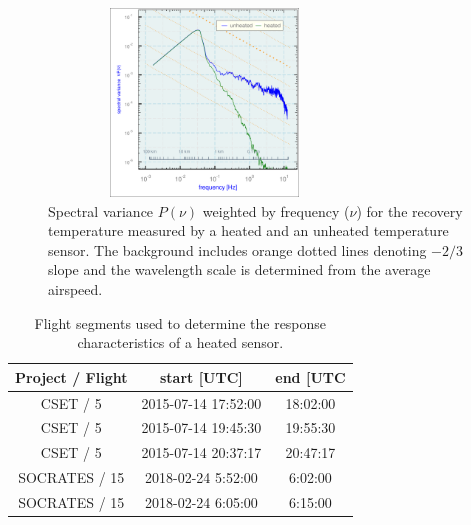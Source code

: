 \documentclass[amt, manuscript]{copernicus}
\begin{document}
\begin{figure}

\begin{center}\includegraphics[width=8.3cm,height=5cm]{figure/fig3} \end{center}
\caption{Spectral variance $P(\nu)$ weighted by frequency ($\nu$) for the recovery temperature measured by a heated and an unheated temperature sensor. The background includes orange dotted lines denoting $-2/3$ slope and the wavelength scale is determined from the average airspeed.\label{fig:HARCOSpec}}
\end{figure}

\begin{table}[t]
\caption{Flight segments used to determine the response characteristics of
a heated sensor.}
\begin{tabular}{|c|c|c|}
\hline 
\bf{Project / Flight} & \bf{start [UTC]} & \bf{end [UTC}\tabularnewline
\hline 
\hline 
CSET / 5 & 2015-07-14 17:52:00 & 18:02:00\tabularnewline
\hline 
CSET / 5 & 2015-07-14 19:45:30 & 19:55:30\tabularnewline
\hline 
CSET / 5 & 2015-07-14 20:37:17 & 20:47:17\tabularnewline
\hline 
SOCRATES / 15 & 2018-02-24 5:52:00 & 6:02:00\tabularnewline
\hline 
SOCRATES / 15 & 2018-02-24 6:05:00 & 6:15:00\tabularnewline
\hline 
\end{tabular}
\end{table}
\end{document}
